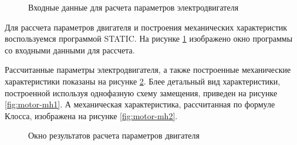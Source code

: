         \begin{figure}[h!]
            \caption{Входные данные для расчета параметров электродвигателя}
            \label{fig:static-scr2}
        \end{figure}       

        Для рассчета параметров двигателя и построения механических
        характеристик воспользуемся программой STATIC.  На рисунке
        \ref{fig:static-scr2} изображено окно программы со входными данными для
        рассчета.

        Рассчитанные параметры электродвигателя, а также построенные
        механические характеристики показаны на рисунке \ref{fig:static-scr1}.
        Блее детальный вид характеристики, построенной используя однофазную
        схему замещения, приведен на рисунке \ref{fig:motor-mh1}.  А
        механическая характеристика, рассчитанная по формуле Клосса, изображена
        на рисунке \ref{fig:motor-mh2}.

        \begin{figure}[h!]
            \caption{Окно результатов расчета параметров двигателя}
            \label{fig:static-scr1}
        \end{figure}

